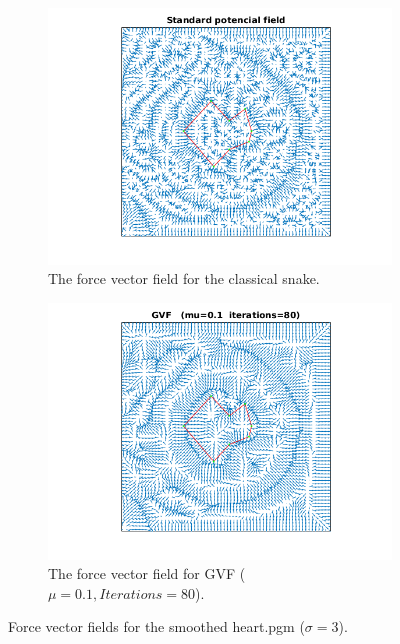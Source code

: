 \documentclass{article}
\begin{document}
\begin{figure}[h!]
\centering
\begin{subfigure}{0.49\textwidth}
  \centering
  \includegraphics[width=\linewidth]{fig9a.png}
  \caption{The force vector field for the classical snake.}
  \label{fig9a}
\end{subfigure}
\begin{subfigure}{0.49\textwidth}
  \centering
  \includegraphics[width=\linewidth]{fig9b.png}
  \caption{The force vector field for GVF ($\mu = 0.1, Iterations=80$).}
  \label{fig9b}
\end{subfigure}
\caption{Force vector fields for the smoothed heart.pgm ($\sigma=3$).}
\label{fig9}
\end{figure}

\subsection{}
\end{document}
